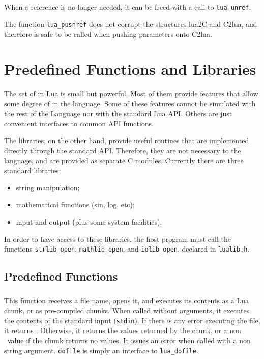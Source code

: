 When a reference is no longer needed,
it can be freed with a call to \verb'lua_unref'.

The function \verb|lua_pushref| does not corrupt the
structures lua2C and C2lua, and therefore is safe to
be called when pushing parameters onto C2lua.



\section{Predefined Functions and Libraries}

The set of  in Lua is small but powerful.
Most of them provide features that allow some degree of
 in the language.
Some of these features cannot be simulated with the rest of the
Language nor with the standard Lua API.
Others are just convenient interfaces to common API functions.

The libraries, on the other hand, provide useful routines
that are implemented directly through the standard API.
Therefore, they are not necessary to the language,
and are provided as separate C modules.
Currently there are three standard libraries:
\begin{itemize}
\item string manipulation;
\item mathematical functions (sin, log, etc);
\item input and output (plus some system facilities).
\end{itemize}
In order to have access to these libraries,
the host program must call the functions
\verb-strlib_open-, \verb-mathlib_open-, and \verb-iolib_open-,
declared in \verb-lualib.h-.


\subsection{Predefined Functions}

\subsubsection*{}
This function receives a file name,
opens it, and executes its contents as a Lua chunk,
or as pre-compiled chunks.
When called without arguments,
it executes the contents of the standard input (\verb'stdin').
If there is any error executing the file, it returns \nil.
Otherwise, it returns the values returned by the chunk,
or a non \nil\ value if the chunk returns no values.
It issues an error when called with a non string argument.
\verb|dofile| is simply an interface to \verb|lua_dofile|.

